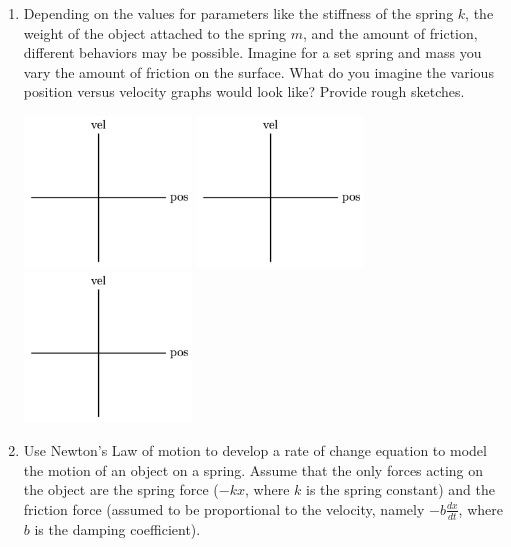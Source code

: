 \begin{enumerate}

\item	Depending on the values for parameters like the stiffness of the spring $k$, the weight of the object attached to the spring $m$, and the amount of friction, different behaviors may be possible. Imagine for a set spring and mass you vary the amount of friction on the surface. What do you imagine the various position versus velocity graphs would look like? Provide rough sketches.\label{10problem1}

\begin{center}
\includegraphics[width=1.75in]{10/10VelPos.png} \hspace{.25in} \includegraphics[width=1.75in]{10/10VelPos.png} \hspace{.25in} \includegraphics[width=1.75in]{10/10VelPos.png} 
\end{center}
\vfill

\item	Use Newton's Law of motion to develop a rate of change equation to model the motion of an object on a spring. Assume that the only forces acting on the object are the spring force ($-kx$, where $k$ is the spring constant) and the friction force (assumed to be proportional to the velocity, namely  $-b\frac{dx}{dt}$, where $b$ is the damping coefficient). \label{10problem2}
\vfill
\clearpage


\end{enumerate}
